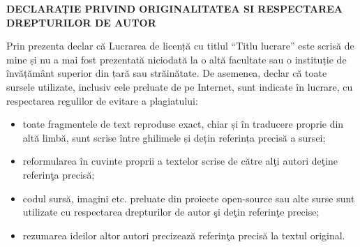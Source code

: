 %
%
%
%
%
%

\begin{center}
\textbf{DECLARAȚIE PRIVIND ORIGINALITATEA SI RESPECTAREA\\
DREPTURILOR DE AUTOR}
\end{center}
Prin prezenta declar că Lucrarea de licență cu titlul “Titlu lucrare” este scrisă de mine și nu a mai fost prezentată niciodată la o altă facultate sau o instituție de învățământ superior din țară sau străinătate. De asemenea, declar că toate sursele utilizate, inclusiv cele preluate de pe Internet, sunt indicate în lucrare, cu respectarea regulilor de evitare a plagiatului:
\begin{itemize}
    \item toate fragmentele de text reproduse exact, chiar și în traducere proprie din altă limbă, sunt scrise între ghilimele și dețin referința precisă a sursei;
    \item reformularea în cuvinte proprii a textelor scrise de către alţi autori deţine referinţa precisă;
    \item codul sursă, imagini etc. preluate din proiecte open-source sau alte surse sunt utilizate cu respectarea drepturilor de autor şi deţin referinţe precise;
    \item rezumarea ideilor altor autori precizează referinţa precisă la textul original.
\end{itemize}